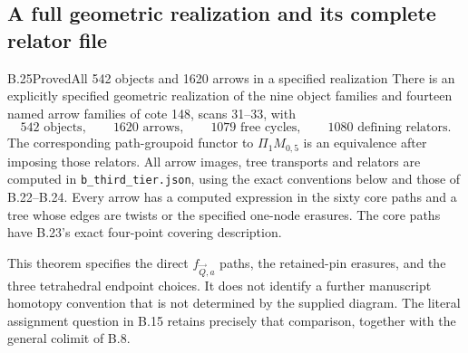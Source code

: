 
\subsection{A full geometric realization and its complete relator file}

\begin{result}{B.25}{Proved}{All 542 objects and 1620 arrows in a specified realization}
There is an explicitly specified geometric realization of the
nine object families and fourteen named arrow families of
cote 148, scans 31--33, with
\[
 542\text{ objects},\qquad1620\text{ arrows},\qquad
 1079\text{ free cycles},\qquad1080\text{ defining relators}.
                                                               \tag{B.61}
\]
The corresponding path-groupoid functor to $\Pi_1M_{0,5}$
is an equivalence after imposing those relators.  All arrow
images, tree transports and relators are computed in
\texttt{b\_third\_tier.json}, using the exact conventions below
and those of B.22--B.24.  Every arrow has a computed expression
in the sixty core paths and a tree whose edges are twists or
the specified one-node erasures.  The core paths have B.23's
exact four-point covering description.

This theorem specifies the direct $f_{\vec Q,a}$ paths,
the retained-pin erasures, and the three tetrahedral endpoint
choices.  It does not identify a further manuscript homotopy
convention that is not determined by the supplied diagram.
The literal assignment question in B.15 retains precisely
that comparison, together with the general colimit of B.8.
\end{result}
